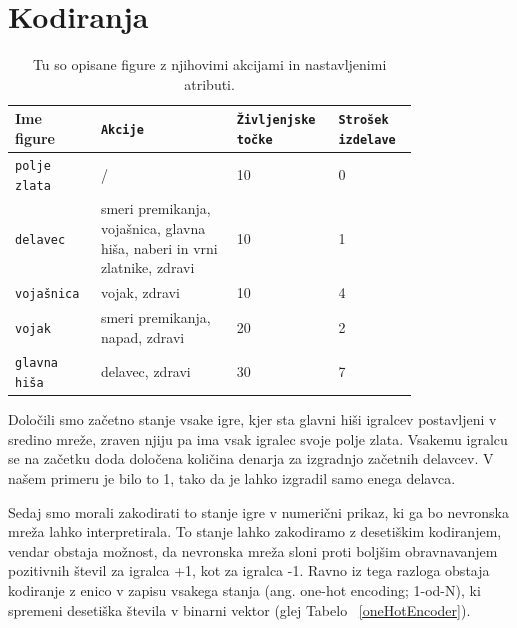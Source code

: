 \documentclass[a4paper, 12pt]{book}
\begin{document}
{\section{Kodiranja}
\label{kodiranja}
\begin{table}
	\begin{center}
	\begin{tabular}{p{0.15\linewidth}|p{0.3\linewidth}|p{0.18\linewidth}|p{0.17\linewidth}}
		Ime figure          & {\tt Akcije}                                                              & {\tt Življenjske točke} & {\tt Strošek izdelave} \\ \hline
		{\tt polje zlata}   & /                                                                         & 10            & 0 \\
		{\tt delavec}       & smeri premikanja, vojašnica, glavna hiša, naberi in vrni zlatnike, zdravi & 10            & 1 \\
		{\tt vojašnica}     & vojak, zdravi                                                             & 10            & 4 \\
		{\tt vojak}         & smeri premikanja, napad, zdravi                                           & 20            & 2 \\
		{\tt glavna hiša}   & delavec, zdravi                                                           & 30            & 7 \\
	\end{tabular}
	\end{center}
	\caption{Tu so opisane figure z njihovimi akcijami in nastavljenimi atributi.}
	\label{tabelfigures}
\end{table}

Določili smo začetno stanje vsake igre, kjer sta glavni hiši igralcev postavljeni v sredino mreže, zraven njiju pa ima vsak igralec svoje polje zlata. 
Vsakemu igralcu se na začetku doda določena količina denarja za izgradnjo začetnih delavcev. 
V našem primeru je bilo to 1, tako da je lahko izgradil samo enega delavca.

Sedaj smo morali zakodirati to stanje igre v numerični prikaz, ki ga bo nevronska mreža lahko interpretirala. 
To stanje lahko zakodiramo z desetiškim kodiranjem, vendar obstaja možnost, da nevronska mreža sloni proti boljšim obravnavanjem pozitivnih števil za igralca +1, kot za igralca -1. 
Ravno iz tega razloga obstaja kodiranje z enico v zapisu vsakega stanja (ang. one-hot encoding; 1-od-N), ki spremeni desetiška števila v binarni vektor (glej Tabelo ~\ref{oneHotEncoder}).

}
\end{document}
